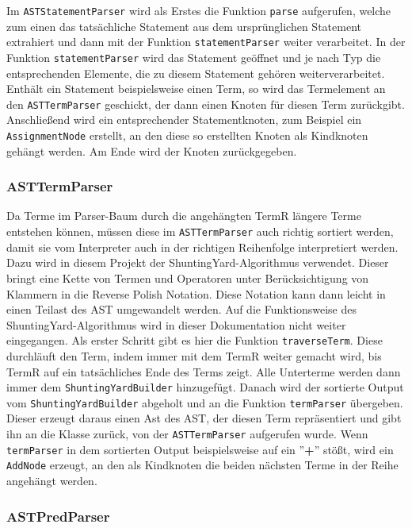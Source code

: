 Im \texttt{ASTStatementParser} wird als Erstes die Funktion \texttt{parse} aufgerufen, welche zum einen das tatsächliche Statement aus dem ursprünglichen Statement extrahiert und dann mit der Funktion \texttt{statementParser} weiter verarbeitet. 
\newline
\newline
In der Funktion \texttt{statementParser} wird das Statement geöffnet und je nach Typ die entsprechenden Elemente, die zu diesem Statement gehören weiterverarbeitet. Enthält ein Statement beispielsweise einen Term, so wird das Termelement an den \texttt{ASTTermParser} geschickt, der dann einen Knoten für diesen Term zurückgibt. Anschließend wird ein entsprechender Statementknoten, zum Beispiel ein \texttt{AssignmentNode} erstellt, an den diese so erstellten Knoten als Kindknoten gehängt werden. 
Am Ende wird der Knoten zurückgegeben.

\subsubsection{ASTTermParser}

Da Terme im Parser-Baum durch die angehängten TermR längere Terme entstehen können, müssen diese im  \texttt{ASTTermParser} auch richtig sortiert werden, damit sie vom Interpreter auch in der richtigen Reihenfolge interpretiert werden. 
Dazu wird in diesem Projekt der ShuntingYard-Algorithmus verwendet. Dieser bringt eine Kette von Termen und Operatoren unter Berücksichtigung von Klammern in die Reverse Polish Notation. Diese Notation kann dann leicht in einen Teilast des AST umgewandelt werden. Auf die Funktionsweise des ShuntingYard-Algorithmus wird in dieser Dokumentation nicht weiter eingegangen.
Als erster Schritt gibt es hier die Funktion \texttt{traverseTerm}. Diese durchläuft den Term, indem immer mit dem TermR weiter gemacht wird, bis TermR auf ein tatsächliches Ende des Terms zeigt. Alle Unterterme werden dann immer dem \texttt{ShuntingYardBuilder} hinzugefügt. 
Danach wird der sortierte Output vom \texttt{ShuntingYardBuilder} abgeholt und an die Funktion \texttt{termParser} übergeben.
Dieser erzeugt daraus einen Ast des AST, der diesen Term repräsentiert und gibt ihn an die Klasse zurück, von der \texttt{ASTTermParser} aufgerufen wurde.
Wenn \texttt{termParser} in dem sortierten Output beispielsweise auf ein ''\textbf{+}'' stößt, wird ein \texttt{AddNode} erzeugt, an den als Kindknoten die beiden nächsten Terme in der Reihe angehängt werden.

\subsubsection{ASTPredParser}

